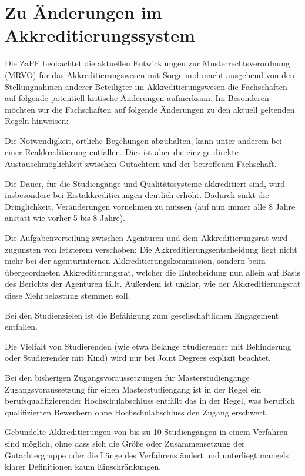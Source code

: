 \documentclass[DIV=calc]{scrartcl}
\begin{document}
\section*{Zu Änderungen im Akkreditierungssystem}
Die ZaPF beobachtet die aktuellen Entwicklungen
zur Musterrechtsverordnung (MRVO) für das Akkreditierungswesen mit Sorge und macht ausgehend von den Stellungnahmen anderer Beteiligter im Akkreditierungswesen die Fachschaften auf folgende potentiell kritische Änderungen aufmerksam.
Im Besonderen möchten wir die Fachschaften auf folgende Änderungen zu den aktuell geltenden Regeln hinweisen:
\begin{compactitem}
\item Die Notwendigkeit, örtliche Begehungen abzuhalten, kann unter anderem bei einer Reakkreditierung entfallen. Dies ist aber die einzige direkte Austauschmöglichkeit zwischen Gutachtern und der betroffenen Fachschaft.
\item Die Dauer, für die Studiengänge und Qualitätssysteme akkreditiert sind, wird insbesondere bei Erstakkreditierungen deutlich erhöht. Dadurch sinkt die Dringlichkeit, Veränderungen vornehmen zu müssen (auf nun immer alle 8 Jahre anstatt wie vorher 5 bis 8 Jahre).
\item Die Aufgabenverteilung zwischen Agenturen und dem Akkreditierungsrat wird zugunsten von letzterem verschoben: Die Akkreditierungsentscheidung liegt nicht mehr bei der agenturinternen Akkreditierungskommission, sondern beim übergeordneten Akkreditierungsrat, welcher die Entscheidung nun allein auf Basis des Berichts der Agenturen fällt. Außerdem ist unklar, wie der Akkreditierungsrat diese Mehrbelastung stemmen soll.
\item Bei den Studienzielen ist die Befähigung zum gesellschaftlichen Engagement entfallen.
\item Die Vielfalt von Studierenden (wie etwa Belange Studierender mit Behinderung oder Studierender mit Kind) wird nur bei Joint Degrees explizit beachtet.
\item Bei den bisherigen Zugangsvoraussetzungen für Masterstudiengänge \glqq Zugangsvoraussetzung für einen Masterstudiengang ist in der Regel ein berufsqualifizierender Hochschulabschluss\grqq{} entfällt das \glqq in der Regel\grqq{}, was beruflich qualifizierten Bewerbern ohne Hochschulabschluss den Zugang erschwert.
\item Gebündelte Akkreditierungen von bis zu 10 Studiengängen in einem Verfahren sind möglich, ohne dass sich die Größe oder Zusammensetzung der Gutachtergruppe oder die Länge des Verfahrens ändert und unterliegt mangels klarer Definitionen kaum Einschränkungen.

\end{compactitem}
\end{document}
